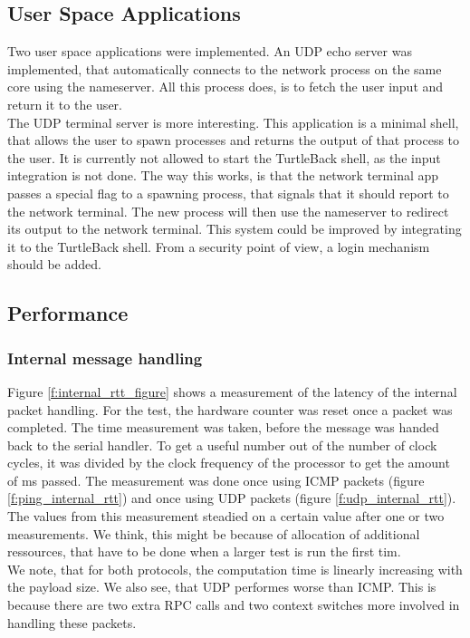 \subsection{User Space Applications}
Two user space applications were implemented. An UDP echo server was implemented, that automatically connects to the network process on the same core using the nameserver. All this process does, is to fetch the user input and return it to the user.\\
The UDP terminal server is more interesting. This application is a minimal shell, that allows the user to spawn processes and returns the output of that process to the user. It is currently not allowed to start the TurtleBack shell, as the input integration is not done. The way this works, is that the network terminal app passes a special flag to a spawning process, that signals that it should report to the network terminal. The new process will then use the nameserver to redirect its output to the network terminal. This system could be improved by integrating it to the TurtleBack shell. From a security point of view, a login mechanism should be added.

\subsection{Performance}

\subsubsection{Internal message handling \label{ss:network_internal_message_handling}}
Figure \ref{f:internal_rtt_figure} shows a measurement of the latency of the internal packet handling. For the test, the hardware counter was reset once a packet was completed. The time measurement was taken, before the message was handed back to the serial handler. To get a useful number out of the number of clock cycles, it was divided by the clock frequency of the processor to get the amount of ms passed. The measurement was done once using ICMP packets (figure \ref{f:ping_internal_rtt}) and once using UDP packets (figure \ref{f:udp_internal_rtt}). The values from this measurement steadied on a certain value after one or two measurements. We think, this might be because of allocation of additional ressources, that have to be done when a larger test is run the first tim. \\
We note, that for both protocols, the computation time is linearly increasing with the payload size. We also see, that UDP performes worse than ICMP. This is because there are two extra RPC calls and two context switches more involved in handling these packets.

